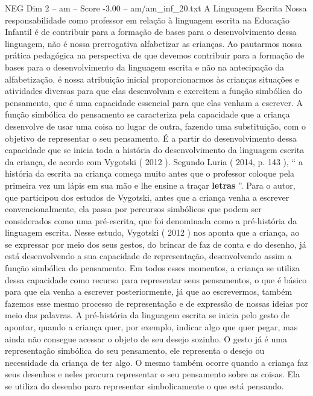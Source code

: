 \begin{textsample}{NEG Dim 2 – am – Score -3.00 – am/am\_inf\_20.txt}  \label{ex:f2_neg_132}
A Linguagem Escrita Nossa responsabilidade como professor em relação à linguagem escrita na Educação Infantil é de contribuir para a formação de bases para o desenvolvimento dessa linguagem, não é nossa prerrogativa alfabetizar as crianças.
Ao pautarmos nossa prática pedagógica na perspectiva de que devemos contribuir para a formação de bases para o desenvolvimento da linguagem escrita e não na antecipação da alfabetização, é nossa atribuição inicial proporcionarmos às crianças situações e atividades diversas para que elas desenvolvam e exercitem a função simbólica do pensamento, que é uma capacidade essencial para que elas venham a escrever.
A função simbólica do pensamento se caracteriza pela capacidade que a criança desenvolve de usar uma coisa no lugar de outra, fazendo uma substituição, com o objetivo de representar o seu pensamento.
É a partir do desenvolvimento dessa capacidade que se inicia toda a história do desenvolvimento da linguagem escrita da criança, de acordo com Vygotski ( 2012 ).
Segundo Luria ( 2014, p. 143 ), “ a história da escrita na criança começa muito antes que o professor coloque pela primeira vez um lápis em sua mão e lhe ensine a traçar \textbf{letras} ”.
Para o autor, que participou dos estudos de Vygotski, antes que a criança venha a escrever convencionalmente, ela passa por percursos simbólicos que podem ser considerados como uma pré-escrita, que foi denominada como a pré-história da linguagem escrita.
Nesse estudo, Vygotski ( 2012 ) nos aponta que a criança, ao se expressar por meio dos seus gestos, do brincar de faz de conta e do desenho, já está desenvolvendo a sua capacidade de representação, desenvolvendo assim a função simbólica do pensamento.
Em todos esses momentos, a criança se utiliza dessa capacidade como recurso para representar seus pensamentos, o que é básico para que ela venha a escrever posteriormente, já que ao escrevermos, também fazemos esse mesmo processo de representação e de expressão de nossas ideias por meio das palavras.
A pré-história da linguagem escrita se inicia pelo gesto de apontar, quando a criança quer, por exemplo, indicar algo que quer pegar, mas ainda não consegue acessar o objeto de seu desejo sozinho.
O gesto já é uma representação simbólica do seu pensamento, ele representa o desejo ou necessidade da criança de ter algo.
O mesmo também ocorre quando a criança faz seus desenhos e neles procura representar o seu pensamento sobre as coisas.
Ela se utiliza do desenho para representar simbolicamente o que está pensando.

\end{textsample}
